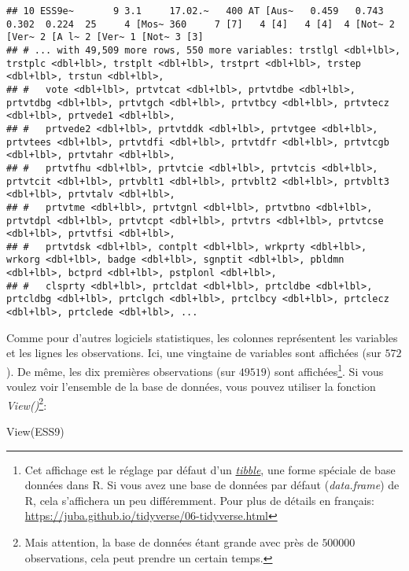 \documentclass[
]{book}
\newenvironment{Shaded}{\begin{snugshade}}{\end{snugshade}}
\newcommand{\FunctionTok}[1]{\textcolor[rgb]{0.00,0.00,0.00}{#1}}
\newcommand{\NormalTok}[1]{#1}
\begin{document}
\begin{verbatim}
## 10 ESS9e~       9 3.1     17.02.~   400 AT [Aus~   0.459   0.743   0.302  0.224  25     4 [Mos~ 360     7 [7]   4 [4]   4 [4]  4 [Not~ 2 [Ver~ 2 [A l~ 2 [Ver~ 1 [Not~ 3 [3]  
## # ... with 49,509 more rows, 550 more variables: trstlgl <dbl+lbl>, trstplc <dbl+lbl>, trstplt <dbl+lbl>, trstprt <dbl+lbl>, trstep <dbl+lbl>, trstun <dbl+lbl>,
## #   vote <dbl+lbl>, prtvtcat <dbl+lbl>, prtvtdbe <dbl+lbl>, prtvtdbg <dbl+lbl>, prtvtgch <dbl+lbl>, prtvtbcy <dbl+lbl>, prtvtecz <dbl+lbl>, prtvede1 <dbl+lbl>,
## #   prtvede2 <dbl+lbl>, prtvtddk <dbl+lbl>, prtvtgee <dbl+lbl>, prtvtees <dbl+lbl>, prtvtdfi <dbl+lbl>, prtvtdfr <dbl+lbl>, prtvtcgb <dbl+lbl>, prtvtahr <dbl+lbl>,
## #   prtvtfhu <dbl+lbl>, prtvtcie <dbl+lbl>, prtvtcis <dbl+lbl>, prtvtcit <dbl+lbl>, prtvblt1 <dbl+lbl>, prtvblt2 <dbl+lbl>, prtvblt3 <dbl+lbl>, prtvtalv <dbl+lbl>,
## #   prtvtme <dbl+lbl>, prtvtgnl <dbl+lbl>, prtvtbno <dbl+lbl>, prtvtdpl <dbl+lbl>, prtvtcpt <dbl+lbl>, prtvtrs <dbl+lbl>, prtvtcse <dbl+lbl>, prtvtfsi <dbl+lbl>,
## #   prtvtdsk <dbl+lbl>, contplt <dbl+lbl>, wrkprty <dbl+lbl>, wrkorg <dbl+lbl>, badge <dbl+lbl>, sgnptit <dbl+lbl>, pbldmn <dbl+lbl>, bctprd <dbl+lbl>, pstplonl <dbl+lbl>,
## #   clsprty <dbl+lbl>, prtcldat <dbl+lbl>, prtcldbe <dbl+lbl>, prtcldbg <dbl+lbl>, prtclgch <dbl+lbl>, prtclbcy <dbl+lbl>, prtclecz <dbl+lbl>, prtclede <dbl+lbl>, ...
\end{verbatim}

Comme pour d'autres logiciels statistiques, les colonnes représentent les variables et les lignes les observations. Ici, une vingtaine de variables sont affichées (sur \(572\)). De même, les dix premières observations (sur \(49519\)) sont affichées\footnote{Cet affichage est le réglage par défaut d'un \href{https://tibble.tidyverse.org/}{\emph{tibble}}, une forme spéciale de base données dans R. Si vous avez une base de données par défaut (\emph{data.frame}) de R, cela s'affichera un peu différemment. Pour plus de détails en français: \url{https://juba.github.io/tidyverse/06-tidyverse.html}}. Si vous voulez voir l'ensemble de la base de données, vous pouvez utiliser la fonction \emph{View()}\footnote{Mais attention, la base de données étant grande avec près de \(500000\) observations, cela peut prendre un certain temps.}:

\begin{Shaded}
\begin{Highlighting}[]
\FunctionTok{View}\NormalTok{(ESS9)}
\end{Highlighting}
\end{Shaded}
\end{document}

